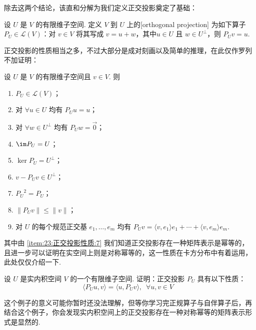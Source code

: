 除去这两个结论，该直和分解为我们定义正交投影奠定了基础：
\begin{definition}
    设 $ U $ 是 $ V $ 的有限维子空间. 定义 $ V $ 到 $ U $ 上的[orthogonal projection]
    为如下算子$ P_U \in \mathcal{L} (V)$：对 $ v \in V $ 将其写成 $ v = u + w $，其中$ u \in U $ 且 $ w \in U^{\perp }$，则 $ P_U v = u $.
\end{definition}

正交投影的性质相当之多，不过大部分是成对刻画以及简单的推理，在此仅作罗列不加证明：

设 $ U $ 是 $ V $ 的有限维子空间且 $ v \in V$. 则
\begin{enumerate}
    \item $ P_U \in \mathcal{L} (V) $；

    \item 对 $ \forall u \in U$ 均有 $ P_U u = u $；

    \item 对 $ \forall w \in U^{\perp}$ 均有 $ P_U w = \vec{0} $；

    \item $ \im P_U = U$；

    \item $ \ker P_U = U^{\perp}$；

    \item $ v - P_U v \in U^{\perp}$；

    \item \label{item:23:正交投影性质:7}
          $ {P_U}^{2} = P_U$；

    \item $ \lVert P_U v\rVert \leqslant \lVert v \rVert $；

    \item 对 $ U $ 的每个规范正交基 $e_1, \ldots , e_m$ 均有 $ P_U v = \langle v, e_1 \rangle e_1 + \cdots + \langle v, e_m \rangle e_m$.
\end{enumerate}
其中由 \ref*{item:23:正交投影性质:7} 我们知道正交投影存在一种矩阵表示是幂等的，且进一步可以证明在实空间上则是对称幂等的，这一性质在卡方分布中有着运用，此处仅仅介绍一下.

\begin{example}
    设 $ U $ 是实内积空间 $ V $ 的一个有限维子空间. 证明：正交投影 $ P_U $ 具有以下性质：
    \[\langle P_U u, v\rangle = \langle u, P_U v\rangle, \enspace \forall u, v \in V \]
\end{example}

这个例子的意义可能你暂时还没法理解，但等你学习完正规算子与自伴算子后，再结合这个例子，你会发现实内积空间上的正交投影存在一种对称幂等的矩阵表示形式是显然的.

